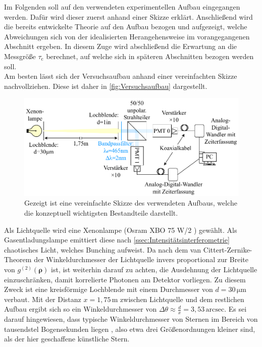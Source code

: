 Im Folgenden soll auf den verwendeten experimentellen Aufbau eingegangen werden. 
Dafür wird dieser zuerst anhand einer Skizze erklärt. 
Anschließend wird die bereits entwickelte Theorie auf den Aufbau bezogen und aufgezeigt, welche Abweichungen sich von der idealisierten Herangehensweise im vorangegangenen Abschnitt ergeben. 
In diesem Zuge wird abschließend die Erwartung an die Messgröße $\tau_{\mathrm{c}}$ berechnet, auf welche sich in späteren Abschnitten bezogen werden soll. \\

Am besten lässt sich der Versuchsaufbau anhand einer vereinfachten Skizze nachvollziehen. Diese ist daher in \autoref{fig:Versuchsaufbau} dargestellt. 
\begin{figure}[h]
    \centering
    \includegraphics[width=0.9\linewidth]{images/Aufbau/Aufbau.pdf}
    \caption{Gezeigt ist eine vereinfachte Skizze des verwendeten Aufbaus, welche die konzeptuell wichtigsten Bestandteile darstellt.}
    \label{fig:Versuchsaufbau}
\end{figure}
Als Lichtquelle wird eine Xenonlampe (Osram XBO 75 W/2 \cite{XBO75OSRAM}) gewählt. 
Als Gasentladungslampe emittiert diese nach \autoref{ssec:Intensitätsinterferometrie} chaotisches Licht, welches Bunching aufweist. 
Da nach dem van Cittert-Zernike-Theorem der Winkeldurchmesser der Lichtquelle invers proportional zur Breite von $g^{(2)}(\bm{\rho})$ ist, ist weiterhin darauf zu achten, die Ausdehnung der Lichtquelle einzuschränken, damit korrelierte Photonen am Detektor vorliegen. 
Zu diesem Zweck ist eine kreisförmige Lochblende mit einem Durchmesser von $d=30\,\mathrm{\mu m}$ verbaut. 
Mit der Distanz $x=1{,}75\,\mathrm{m}$ zwischen Lichtquelle und dem restlichen Aufbau ergibt sich so ein Winkeldurchmesser von $\Delta \theta \approx \frac{d}{x} = 3{,}53\,\mathrm{arcsec}$. 
Es sei darauf hingewiesen, dass typische Winkeldurchmesser von Sternen im Bereich von tausendstel Bogensekunden liegen \cite{hanburybrownAngularDiameters321974}, also etwa drei Größenordnungen kleiner sind, als der hier geschaffene \glqq künstliche Stern\grqq. \\
